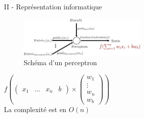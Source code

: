 \documentclass[10pt]{beamer}
\begin{document}
\begin{frame}{II - Représentation informatique}
\begin{figure}
	\centering
    \includegraphics[height=75px]{1-Perceptron.png}
	\caption{Schéma d'un perceptron}	
\end{figure}
\begin{multicols}{2}
$
f
\left(
\begin{pmatrix}
x_1 & \ldots & x_n & b
\end{pmatrix}
\times
\begin{pmatrix}
w_1 \\
\vdots \\
w_n \\
w_b
\end{pmatrix}
\right)
$ \\
La complexité est en $O(n)$
\columnbreak

\end{multicols}
\end{frame}
\end{document}
